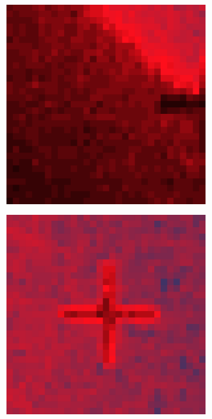 \documentclass[10pt]{scrartcl}
\begin{document}
\begin{figure}[!ht]
\begin{subfigure}[b]{.3\linewidth}
        \includegraphics[width=1.2\linewidth]{../plots_tables_images/1d1dcrop_0_1.eps}
    \end{subfigure}
    \begin{subfigure}[b]{.3\linewidth}
        \centering
        \includegraphics[width=1.2\linewidth]{../plots_tables_images/1d1dcrop_0_4.eps}
    \end{subfigure}


\end{figure}
\end{document}
